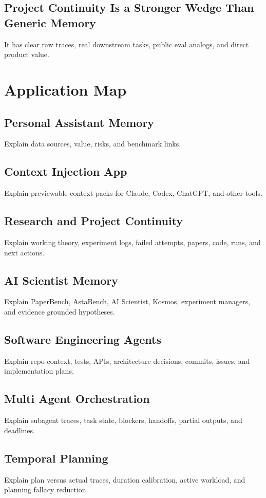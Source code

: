 \documentclass[11pt]{article}
\begin{document}
\subsection{Project Continuity Is a Stronger Wedge Than Generic Memory}
It has clear raw traces, real downstream tasks, public eval analogs, and direct product value.

\section{Application Map}

\subsection{Personal Assistant Memory}
Explain data sources, value, risks, and benchmark links.

\subsection{Context Injection App}
Explain previewable context packs for Claude, Codex, ChatGPT, and other tools.

\subsection{Research and Project Continuity}
Explain working theory, experiment logs, failed attempts, papers, code, runs, and next actions.

\subsection{AI Scientist Memory}
Explain PaperBench, AstaBench, AI Scientist, Kosmos, experiment managers, and evidence grounded hypotheses.

\subsection{Software Engineering Agents}
Explain repo context, tests, APIs, architecture decisions, commits, issues, and implementation plans.

\subsection{Multi Agent Orchestration}
Explain subagent traces, task state, blockers, handoffs, partial outputs, and deadlines.

\subsection{Temporal Planning}
Explain plan versus actual traces, duration calibration, active workload, and planning fallacy reduction.
\end{document}
